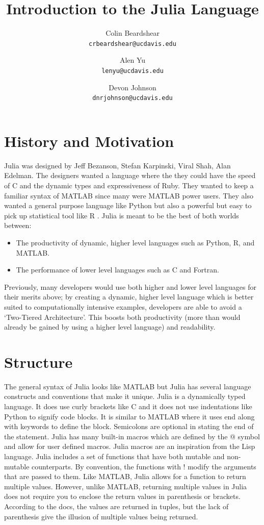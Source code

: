 \documentclass[12pt]{article}
\title{Introduction to the Julia Language}
\author{Colin Beardshear\\ \texttt{crbeardshear@ucdavis.edu} \and
Alen Yu\\ \texttt{lenyu@ucdavis.edu} \and
Devon Johnson\\ \texttt{dnrjohnson@ucdavis.edu}
}
\begin{document}
\maketitle

\section{History and Motivation}

Julia was designed by Jeff Bezanson, Stefan Karpinski, Viral Shah, Alan Edelman. The designers wanted a language where the they could have the speed of C and the dynamic types and expressiveness of Ruby. They wanted to keep a familiar syntax of MATLAB since many were MATLAB power users. They also wanted a general purpose language like Python but also a powerful but easy to pick up statistical tool like R \cite{devblog}.
\newline \newline \noindent
Julia is meant to be the best of both worlds between:
\begin{itemize}
\item The productivity of dynamic, higher level languages such as Python, R, and MATLAB.
\item The performance of lower level languages such as C and Fortran.
\end{itemize}
Previously, many developers would use both higher and lower level languages for their merits above; by creating a dynamic, higher level language which is better suited to computationally intensive examples, developers are able to avoid a `Two-Tiered Architecture'\cite{devpaper}. This boosts both productivity (more than would already be gained by using a higher level language) and readability.

\section{Structure}

	The general syntax of Julia looks like MATLAB but Julia has several language constructs and conventions that make it unique. Julia is a dynamically typed language. It does use curly brackets like C and it does not use indentations like Python to signify code blocks. It is similar to MATLAB where it uses end along with keywords to define the block. Semicolons are optional in stating the end of the statement. Julia has many built-in macros which are defined by the @ symbol and allow for user defined macros. Julia macros are an inspiration from the Lisp language. Julia includes a set of functions that have both mutable and non-mutable counterparts. By convention, the functions with ! modify the arguments that are passed to them. \cite{juliadocs} Like MATLAB, Julia allows for a function to return multiple values. However, unlike MATLAB, returning multiple values in Julia does not require you to enclose the return values in parenthesis or brackets. According to the docs, the values are returned in tuples, but the lack of parenthesis give the illusion of multiple values being returned. \cite{juliadocs}
\end{document}
